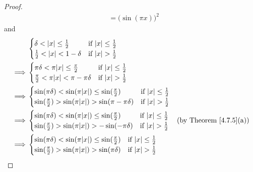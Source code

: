 \begin{proof}
\begin{align*}
                                       & = \big(\sin(\pi x)\big)^2
    \end{align*}
    and
    \begin{align*}
                 & \begin{cases}
            \delta < \abs*{x} \leq \frac{1}{2}  & \text{if } \abs*{x} \leq \frac{1}{2} \\
            \frac{1}{2} < \abs*{x} < 1 - \delta & \text{if } \abs*{x} > \frac{1}{2}    \\
        \end{cases}                                                  \\
        \implies & \begin{cases}
            \pi \delta < \pi \abs*{x} \leq \frac{\pi}{2}    & \text{if } \abs*{x} \leq \frac{1}{2} \\
            \frac{\pi}{2} < \pi \abs*{x} < \pi - \pi \delta & \text{if } \abs*{x} > \frac{1}{2}    \\
        \end{cases}                                                  \\
        \implies & \begin{cases}
            \sin(\pi \delta) < \sin(\pi \abs*{x}) \leq \sin(\frac{\pi}{2})    & \text{if } \abs*{x} \leq \frac{1}{2} \\
            \sin(\frac{\pi}{2}) > \sin(\pi \abs*{x}) > \sin(\pi - \pi \delta) & \text{if } \abs*{x} > \frac{1}{2}    \\
        \end{cases}                                                  \\
        \implies & \begin{cases}
            \sin(\pi \delta) < \sin(\pi \abs*{x}) \leq \sin(\frac{\pi}{2}) & \text{if } \abs*{x} \leq \frac{1}{2} \\
            \sin(\frac{\pi}{2}) > \sin(\pi \abs*{x}) > -\sin(-\pi \delta)  & \text{if } \abs*{x} > \frac{1}{2}    \\
        \end{cases}             & \text{(by Theorem \ref{4.7.5}(a))} \\
        \implies & \begin{cases}
            \sin(\pi \delta) < \sin(\pi \abs*{x}) \leq \sin(\frac{\pi}{2}) & \text{if } \abs*{x} \leq \frac{1}{2} \\
            \sin(\frac{\pi}{2}) > \sin(\pi \abs*{x}) > \sin(\pi \delta)    & \text{if } \abs*{x} > \frac{1}{2}    \\

\end{cases}
\end{align*}
\end{proof}
